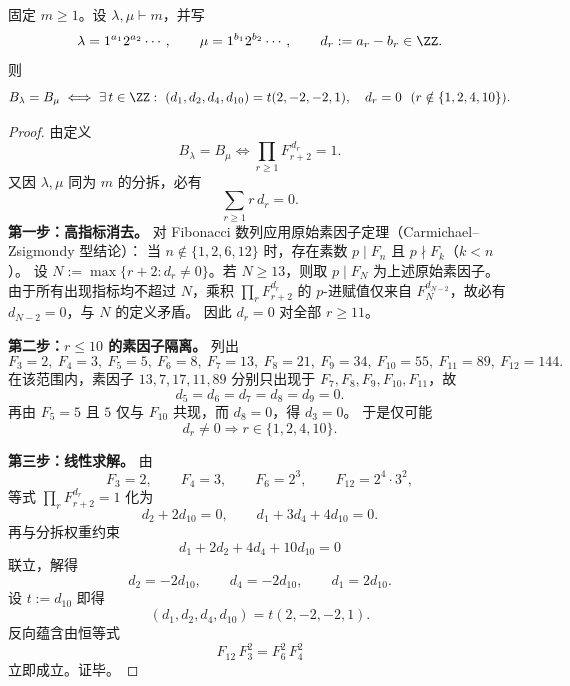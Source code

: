 \begin{theorem}\label{thm:xi-terminal-replica-softcore-partition-fib-collision-kernel}
固定 \(m\ge 1\)。设 \(\lambda,\mu\vdash m\)，并写
\[
\lambda=1^{a_1}2^{a_2}\cdots,\qquad
\mu=1^{b_1}2^{b_2}\cdots,\qquad
d_r:=a_r-b_r\in\ZZ.
\]
则
\[
B_\lambda=B_\mu
\iff
\exists\,t\in\ZZ:\ 
(d_1,d_2,d_4,d_{10})=t(2,-2,-2,1),\quad
d_r=0\ \ (r\notin\{1,2,4,10\}).
\]
\end{theorem}
\begin{proof}
由定义
\[
B_\lambda=B_\mu
\iff
\prod_{r\ge 1}F_{r+2}^{\,d_r}=1.
\]
又因 \(\lambda,\mu\) 同为 \(m\) 的分拆，必有
\[
\sum_{r\ge 1}r\,d_r=0.
\]
\textbf{第一步：高指标消去。}
对 Fibonacci 数列应用原始素因子定理（Carmichael--Zsigmondy 型结论）：
当 \(n\notin\{1,2,6,12\}\) 时，存在素数 \(p\mid F_n\) 且 \(p\nmid F_k\)（\(k<n\)）。
设 \(N:=\max\{r+2:d_r\neq 0\}\)。若 \(N\ge 13\)，则取 \(p\mid F_N\) 为上述原始素因子。
由于所有出现指标均不超过 \(N\)，乘积 \(\prod_rF_{r+2}^{d_r}\) 的 \(p\)-进赋值仅来自 \(F_N^{d_{N-2}}\)，故必有 \(d_{N-2}=0\)，与 \(N\) 的定义矛盾。
因此 \(d_r=0\) 对全部 \(r\ge 11\)。

\textbf{第二步：\(r\le 10\) 的素因子隔离。}
列出
\[
F_3=2,\ F_4=3,\ F_5=5,\ F_6=8,\ F_7=13,\ F_8=21,\ F_9=34,\ F_{10}=55,\ F_{11}=89,\ F_{12}=144.
\]
在该范围内，素因子 \(13,7,17,11,89\) 分别只出现于 \(F_7,F_8,F_9,F_{10},F_{11}\)，故
\[
d_5=d_6=d_7=d_8=d_9=0.
\]
再由 \(F_5=5\) 且 \(5\) 仅与 \(F_{10}\) 共现，而 \(d_8=0\)，得 \(d_3=0\)。
于是仅可能
\[
d_r\neq 0\Rightarrow r\in\{1,2,4,10\}.
\]

\textbf{第三步：线性求解。}
由
\[
F_3=2,\qquad F_4=3,\qquad F_6=2^3,\qquad F_{12}=2^4\cdot 3^2,
\]
等式 \(\prod_rF_{r+2}^{d_r}=1\) 化为
\[
d_2+2d_{10}=0,\qquad d_1+3d_4+4d_{10}=0.
\]
再与分拆权重约束
\[
d_1+2d_2+4d_4+10d_{10}=0
\]
联立，解得
\[
d_2=-2d_{10},\qquad d_4=-2d_{10},\qquad d_1=2d_{10}.
\]
设 \(t:=d_{10}\) 即得
\[
(d_1,d_2,d_4,d_{10})=t(2,-2,-2,1).
\]
反向蕴含由恒等式
\[
F_{12}\,F_3^2=F_6^2\,F_4^2
\]
立即成立。证毕。
\end{proof}

